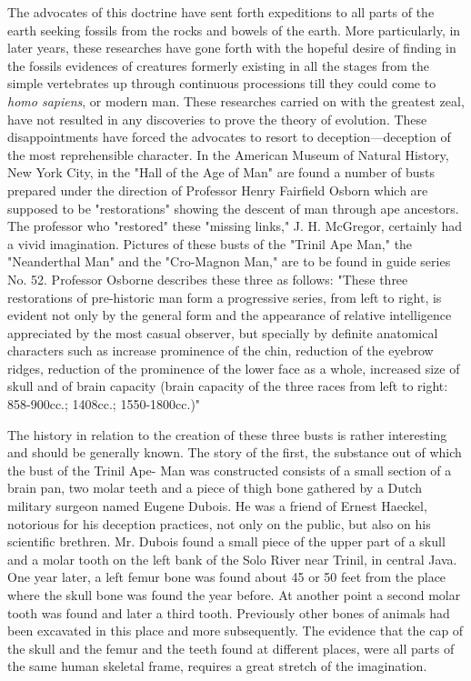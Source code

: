 The advocates of this doctrine have sent forth expeditions to all parts of the earth seeking
fossils from the rocks and bowels of the earth. More particularly, in later years, these
researches have gone forth with the hopeful desire of finding in the fossils evidences of
creatures formerly existing in all the stages from the simple vertebrates up through
continuous processions till they could come to \textit{homo sapiens}, or modern man. These
researches carried on with the greatest zeal, have not resulted in any discoveries to prove the
theory of evolution. These disappointments have forced the advocates to resort to
deception—deception of the most reprehensible character. In the American Museum of
Natural History, New York City, in the "Hall of the Age of Man" are found a number of
busts prepared under the direction of Professor Henry Fairfield Osborn which are supposed
to be "restorations" showing the descent of man through ape ancestors. The professor who
"restored" these "missing links," J. H. McGregor, certainly had a vivid imagination. Pictures
of these busts of the "Trinil Ape Man," the "Neanderthal Man" and the "Cro-Magnon Man,"
are to be found in guide series No. 52. Professor Osborne describes these three as follows:
"These three restorations of pre-historic man form a progressive series, from left to right, is
evident not only by the general form and the appearance of relative intelligence appreciated
by the most casual observer, but specially by definite anatomical characters such as increase
prominence of the chin, reduction of the eyebrow ridges, reduction of the prominence of the
lower face as a whole, increased size of skull and of brain capacity (brain capacity of the
three races from left to right: 858-900cc.; 1408cc.; 1550-1800cc.)"

The history in relation to the creation of these three busts is rather interesting and should be
generally known. The story of the first, the substance out of which the bust of the Trinil Ape-
Man was constructed consists of a small section of a brain pan, two molar teeth and a piece
of thigh bone gathered by a Dutch military surgeon named Eugene Dubois. He was a friend
of Ernest Haeckel, notorious for his deception practices, not only on the public, but also on
his scientific brethren. Mr. Dubois found a small piece of the upper part of a skull and a
molar tooth on the left bank of the Solo River near Trinil, in central Java. One year later, a
left femur bone was found about 45 or 50 feet from the place where the skull bone was found
the year before. At another point a second molar tooth was found and later a third tooth.
Previously other bones of animals had been excavated in this place and more subsequently.
The evidence that the cap of the skull and the femur and the teeth found at different places,
were all parts of the same human skeletal frame, requires a great stretch of the imagination.

